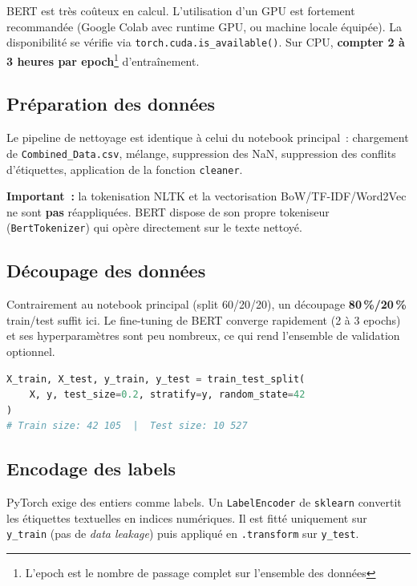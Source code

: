 \documentclass[12pt,a4paper]{report}
\begin{document}
\begin{warn}
BERT est très coûteux en calcul. L'utilisation d'un GPU est fortement recommandée
(Google Colab avec runtime GPU, ou machine locale équipée). La disponibilité se vérifie
via \texttt{torch.cuda.is\_available()}. Sur CPU, \textbf{compter 2 à 3 heures par epoch}\footnote{L'epoch est le nombre de passage complet sur l'ensemble des données}
d'entraînement.
\end{warn}

\subsection{Préparation des données}

Le pipeline de nettoyage est identique à celui du notebook principal~: chargement de
\texttt{Combined\_Data.csv}, mélange, suppression des NaN, suppression des conflits
d'étiquettes, application de la fonction \texttt{cleaner}.

\textbf{Important~:} la tokenisation NLTK et la vectorisation BoW/TF-IDF/Word2Vec
ne sont \textbf{pas} réappliquées. BERT dispose de son propre tokeniseur
(\texttt{BertTokenizer}) qui opère directement sur le texte nettoyé.

\vfill

\subsection{Découpage des données}

Contrairement au notebook principal (split 60/20/20), un découpage \textbf{80\,\%/20\,\%}
train/test suffit ici. Le fine-tuning de BERT converge rapidement (2 à 3 epochs) et ses
hyperparamètres sont peu nombreux, ce qui rend l'ensemble de validation optionnel.

\begin{lstlisting}[language=Python]
X_train, X_test, y_train, y_test = train_test_split(
    X, y, test_size=0.2, stratify=y, random_state=42
)
# Train size: 42 105  |  Test size: 10 527
\end{lstlisting}

\subsection{Encodage des labels}

PyTorch exige des entiers comme labels. Un \texttt{LabelEncoder} de \texttt{sklearn}
convertit les étiquettes textuelles en indices numériques. Il est fitté uniquement sur
\texttt{y\_train} (pas de \textit{data leakage}) puis appliqué en \texttt{.transform}
sur \texttt{y\_test}.
\end{document}
